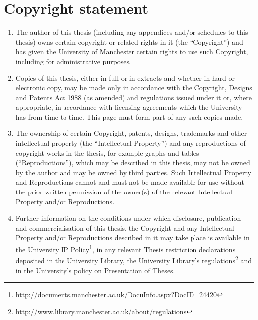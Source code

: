 \cleardoublepage
\vspace*{\fill}
\vspace{-10em}

\section*{Copyright statement}

\begin{enumerate}[label=\roman*.]

\item The author of this thesis (including any appendices and/or schedules to this thesis) owns certain copyright or related rights in it (the ``Copyright'') and has given the University of Manchester certain rights to use such Copyright, including for administrative purposes.

\item Copies of this thesis, either in full or in extracts and whether in hard or electronic copy, may be made only in accordance with the Copyright, Designs and Patents Act 1988 (as amended) and regulations issued under it or, where appropriate, in accordance with licensing agreements which the University has from time to time. This page must form part of any such copies made.

\item The ownership of certain Copyright, patents, designs, trademarks and other intellectual property (the ``Intellectual Property'') and any reproductions of copyright works in the thesis, for example graphs and tables (``Reproductions''), which may be described in this thesis, may not be owned by the author and may be owned by third parties. Such Intellectual Property and Reproductions cannot and must not be made available for use without the prior written permission of the owner(s) of the relevant Intellectual Property and/or Reproductions.

\item Further information on the conditions under which disclosure, publication and commercialisation of this thesis, the Copyright and any Intellectual Property and/or Reproductions described in it may take place is available in the University IP Policy\footnote{\url{http://documents.manchester.ac.uk/DocuInfo.aspx?DocID=24420}}, in any relevant Thesis restriction declarations deposited in the University Library, the University Library’s regulations\footnote{\url{http://www.library.manchester.ac.uk/about/regulations}} and in the University’s policy on Presentation of Theses.

\end{enumerate}

